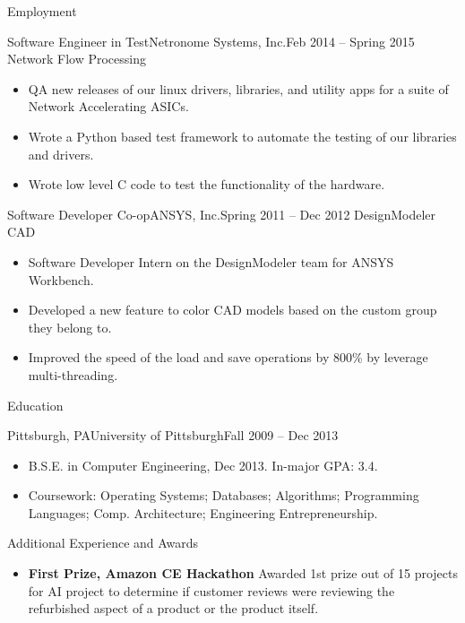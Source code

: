 \documentclass[]{mussocv}
\begin{document}
\begin{cvsection}{Employment}
		\begin{cvsubsection}{Software Engineer in Test}{Netronome Systems, Inc.}{Feb 2014 -- Spring 2015}
			Network Flow Processing
			\begin{itemize}
				\item QA new releases of our linux drivers, libraries, and utility apps for a suite of Network Accelerating ASICs.
				\item Wrote a Python based test framework to automate the testing of our libraries and drivers.
				\item Wrote low level C code to test the functionality of the hardware.
			\end{itemize}
		\end{cvsubsection}

		\begin{cvsubsection}{Software Developer Co-op}{ANSYS, Inc.}{Spring 2011 -- Dec 2012}
			DesignModeler CAD
			\begin{itemize}
				\item Software Developer Intern on the DesignModeler team for ANSYS Workbench. 
				\item Developed a new feature to color CAD models based on the custom group they belong to.
				\item Improved the speed of the load and save operations by 800\% by leverage multi-threading.
			\end{itemize}
		\end{cvsubsection}
	\end{cvsection}
	
	\begin{cvsection}{Education}
		\begin{cvsubsection}{Pittsburgh, PA}{University of Pittsburgh}{Fall 2009 -- Dec 2013}
			\begin{itemize}
				\item B.S.E. in Computer Engineering, Dec 2013.  In-major GPA: 3.4.
				\item Coursework: Operating Systems; Databases; Algorithms; Programming Languages; Comp. Architecture; Engineering Entrepreneurship.
			\end{itemize}
		\end{cvsubsection}
	\end{cvsection}
	
	\begin{cvsection}{Additional Experience and Awards}
		\begin{cvsubsection}{}{}{}	
			\begin{itemize}
				\item \textbf{First Prize, Amazon CE Hackathon} Awarded 1st prize out of 15 projects for AI project to determine if customer reviews were reviewing the refurbished aspect of a product or the product itself.
			\end{itemize}
		\end{cvsubsection}
	\end{cvsection}
	
\end{document}
